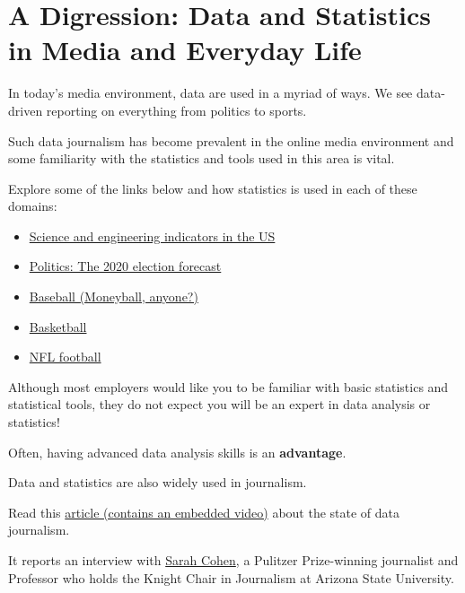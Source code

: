 \documentclass[
  ignorenonframetext,
]{beamer}
\providecommand{\tightlist}{%
  \setlength{\itemsep}{0pt}\setlength{\parskip}{0pt}}
\begin{document}
\hypertarget{a-digression-data-and-statistics-in-media-and-everyday-life}{%
\section{A Digression: Data and Statistics in Media and Everyday
Life}\label{a-digression-data-and-statistics-in-media-and-everyday-life}}

\begin{frame}{}
\protect\hypertarget{section-1}{}
In today's media environment, data are used in a myriad of ways. We see
data-driven reporting on everything from politics to sports.

Such data journalism has become prevalent in the online media
environment and some familiarity with the statistics and tools used in
this area is vital.
\end{frame}

\begin{frame}{}
\protect\hypertarget{section-2}{}
Explore some of the links below and how statistics is used in each of
these domains:

\begin{itemize}
\tightlist
\item
  \href{https://ncses.nsf.gov/pubs/nsb20207}{Science and engineering
  indicators in the US}
\item
  \href{https://projects.fivethirtyeight.com/2020-election-forecast/}{Politics:
  The 2020 election forecast}
\item
  \href{http://projects.fivethirtyeight.com/complete-history-of-mlb/\#}{Baseball
  (Moneyball, anyone?)}
\item
  \href{http://projects.fivethirtyeight.com/complete-history-of-the-nba/\#cavaliers}{Basketball}
\item
  \href{http://fivethirtyeight.com/features/the-nfls-most-run-heavy-and-pass-happy-teams/}{NFL
  football}
\end{itemize}
\end{frame}

\begin{frame}{}
\protect\hypertarget{section-3}{}
Although most employers would like you to be familiar with basic
statistics and statistical tools, they do not expect you will be an
expert in data analysis or statistics!

Often, having advanced data analysis skills is an \textbf{advantage}.
\end{frame}

\begin{frame}{}
\protect\hypertarget{section-4}{}
Data and statistics are also widely used in journalism.

Read this
\href{https://journalistsresource.org/studies/society/news-media/research-chat-new-york-times-sarah-cohen-state-data-journalism-what-reporters-need-know/}{article
(contains an embedded video)} about the state of data journalism.

It reports an interview with
\href{https://isearch.asu.edu/profile/3189494}{Sarah Cohen}, a Pulitzer
Prize-winning journalist and Professor who holds the Knight Chair in
Journalism at Arizona State University.
\end{frame}
\end{document}
